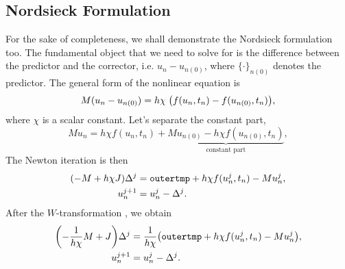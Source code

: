 \documentclass[a4paper,9pt]{article}
\theoremstyle{definition}
\theoremstyle{remark}
\begin{document}
\subsection{Nordsieck Formulation}
For the sake of completeness, we shall demonstrate the Nordsieck formulation
too. The fundamental object that we need to solve for is the difference between
the predictor and the corrector, i.e. $u_n - u_{n(0)}$, where $\{\cdot\}_{n(0)}$
denotes the predictor. The general form
of the nonlinear equation is
\begin{equation}
  M (u_n - u_{n(0)}) = h\chi \; \qty(f(u_n, t_n) - f(u_{n(0)}, t_n)),
\end{equation}
where $\chi$ is a scalar constant.
Let's separate the constant part,
\begin{equation}
  M u_n = h\chi f(u_n, t_n) + \underbrace{M u_{n(0)} - h\chi f(u_{n(0)},
  t_n)}_\text{constant part},
\end{equation}
The Newton iteration is then
\begin{align}
  \qty(-M + h\chi J) \Delta^j &= \texttt{outertmp} + h\chi f(u^j_n, t_n) - M
  u^j_n, \\
  u^{j+1}_n &= u^j_n - \Delta^j.
\end{align}
After the $W$-transformation \cite{hairer2010solving}, we obtain
\begin{align} \label{eq:newton_nord}
  \qty(-\frac{1}{h\chi}M + J) \Delta^j &= \frac{1}{h\chi}\qty(\texttt{outertmp} + h\chi f(u^j_n, t_n) - M
  u^j_n), \\
  u^{j+1}_n &= u^j_n - \Delta^j.
\end{align}



\end{document}
